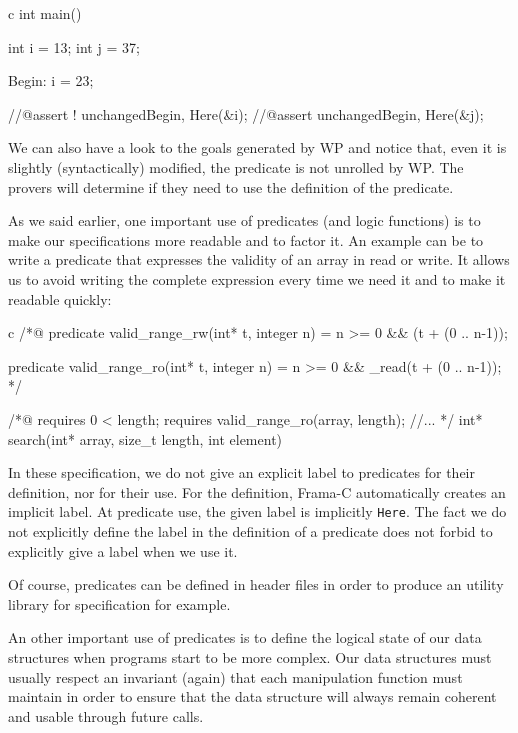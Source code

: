 \begin{CodeBlock}{c}
int main(){
  int i = 13;
  int j = 37;

 Begin:
  i = 23;
 
  //@assert ! unchanged{Begin, Here}(&i);
  //@assert   unchanged{Begin, Here}(&j);
}
\end{CodeBlock}



We can also have a look to the goals generated by WP and notice that,
even it is slightly (syntactically) modified, the predicate is not
unrolled by WP. The provers will determine if they need to use the
definition of the predicate.

As we said earlier, one important use of predicates (and logic
functions) is to make our specifications more readable and to factor it.
An example can be to write a predicate that expresses the validity of an
array in read or write. It allows us to avoid writing the complete
expression every time we need it and to make it readable quickly:



\begin{CodeBlock}{c}
/*@
  predicate valid_range_rw(int* t, integer n) =
    n >= 0 && \valid(t + (0 .. n-1));

  predicate valid_range_ro(int* t, integer n) =
    n >= 0 && \valid_read(t + (0 .. n-1));
*/

/*@
  requires 0 < length;
  requires valid_range_ro(array, length);
  //...
*/
int* search(int* array, size_t length, int element)
\end{CodeBlock}



In these specification, we do not give an explicit label to predicates
for their definition, nor for their use. For the definition, Frama-C
automatically creates an implicit label. At predicate use, the given
label is implicitly \texttt{Here}. The fact we do not explicitly define
the label in the definition of a predicate does not forbid to explicitly
give a label when we use it.

Of course, predicates can be defined in header files in order to produce
an utility library for specification for example.




An other important use of predicates is to define the logical state of
our data structures when programs start to be more complex. Our data
structures must usually respect an invariant (again) that each
manipulation function must maintain in order to ensure that the data
structure will always remain coherent and usable through future calls.



